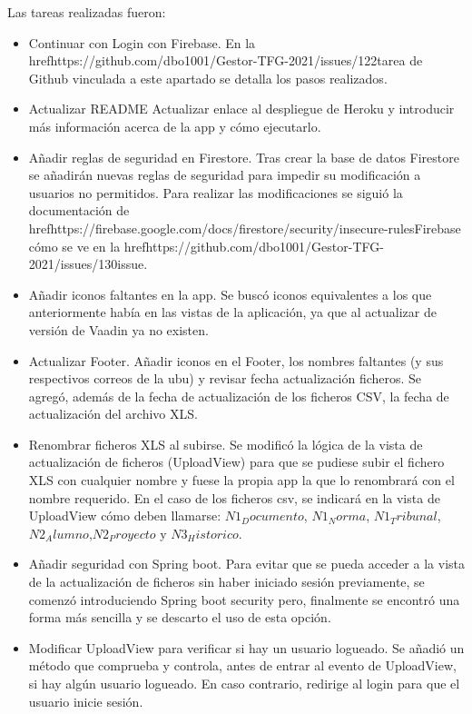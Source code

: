 Las tareas realizadas fueron:
\begin{itemize}
	\tightlist
	\item Continuar con Login con Firebase.
		En la href{https://github.com/dbo1001/Gestor-TFG-2021/issues/122}{tarea de Github} vinculada a este apartado se detalla los pasos realizados.
	\item Actualizar README
		Actualizar enlace al despliegue de Heroku y introducir más información acerca de la app y cómo ejecutarlo.
	\item Añadir reglas de seguridad en Firestore.
		Tras crear la base de datos Firestore se añadirán nuevas reglas de seguridad para impedir su modificación a usuarios no permitidos. Para realizar las modificaciones se siguió la documentación de href{https://firebase.google.com/docs/firestore/security/insecure-rules}{Firebase} cómo se ve en la href{https://github.com/dbo1001/Gestor-TFG-2021/issues/130}{issue}.
	\item Añadir iconos faltantes en la app.
		Se buscó iconos equivalentes a los que anteriormente había en las vistas de la aplicación, ya que al actualizar de versión de Vaadin ya no existen.
	\item Actualizar Footer.
		Añadir iconos en el Footer, los nombres faltantes (y sus respectivos correos de la ubu) y revisar fecha actualización ficheros. Se agregó, además de la fecha de actualización de los ficheros CSV, la fecha de actualización del archivo XLS.
	\item Renombrar ficheros XLS al subirse.
		Se modificó la lógica de la vista de actualización de ficheros (UploadView) para que se pudiese subir el fichero XLS con cualquier nombre y fuese la propia app la que lo renombrará con el nombre requerido. En el caso de los ficheros csv, se indicará en la vista de UploadView cómo deben llamarse: $N1_Documento$, $N1_Norma$, $N1_Tribunal$,$N2_Alumno$,$N2_Proyecto$ y $N3_Historico$.
	\item Añadir seguridad con Spring boot.
		Para evitar que se pueda acceder a la vista de la actualización de ficheros sin haber iniciado sesión previamente, se comenzó introduciendo Spring boot security pero, finalmente se encontró una forma más sencilla y se descarto el uso de esta opción.
	\item Modificar UploadView para verificar si hay un usuario logueado.
		Se añadió un método que comprueba y controla, antes de entrar al evento de UploadView, si hay algún usuario logueado. En caso contrario, redirige al login para que el usuario inicie sesión. 
	
\end{itemize}

